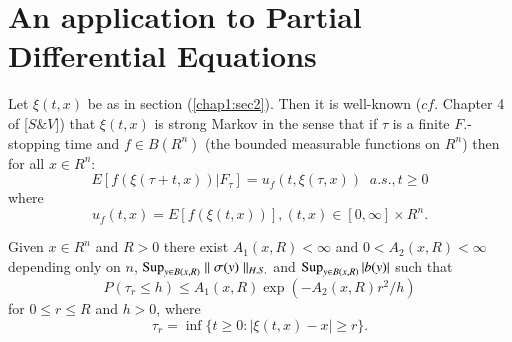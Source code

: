 \section{An application to Partial Differential Equations} %

Let $\xi(t,x)$ be as in section (\ref{chap1:sec2}). Then it is well-known
($cf$. Chapter 4 of [$ S \& V$]) that $\xi(t,x)$ is strong Markov in
the sense that if $\tau$ is a finite $F$.-stopping time and $f \in
B(R^n)$ (the bounded measurable functions on $R^n$) then for all $x
\in R^n$: 
\begin{equation*}
E[f (\xi(\tau + t,x))|F_\tau ]=u_f(t, \xi(\tau, x)) \;\; a.s., t \geq 0
\tag{4.1}\label{chap1:eq4.1}    
\end{equation*}
where
\begin{equation*}
u_f (t,x)=E[f (\xi (t,x))], (t,x) \in [0, \infty ]\times
R^n. \tag{4.2}\label{chap1:eq4.2}     
\end{equation*}

\setcounter{lemma}{2}
\begin{lemma}\label{chap1:lem4.3} %
Given $x \in R^n$ and $ R > 0$ there exist $A_1 (x,R) < \infty $ and $
0 < A_2 (x,R) < \infty $ depending only on $n$, $\operatorname{Sup}\limits_{y \in
  B(x,R)} \parallel \sigma (y) \parallel_{H.S.}$ and $\operatorname{Sup}\limits_{y
  \in B(x,R)}| b(y)|$ such that 
$$
P(\tau_r \leq h) \leq A_1(x,R) \exp (-A_2 (x,R) r^2/h)
$$
for $0 \leq r \leq R $ and $h > 0$, where
$$
\tau_r =\inf \{t \geq 0 : | \xi (t,x) -x | \geq r \}.
$$
\end{lemma}

